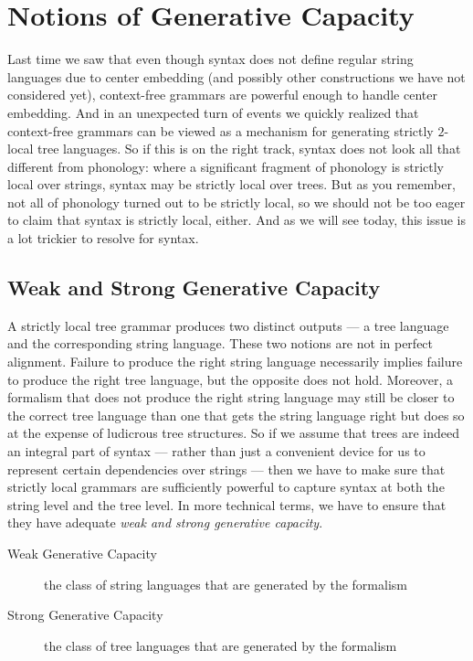 \chapter{Notions of Generative Capacity}
\label{cha:GenCap}

Last time we saw that even though syntax does not define regular string languages due to center embedding (and possibly other constructions we have not considered yet), context-free grammars are powerful enough to handle center embedding.
And in an unexpected turn of events we quickly realized that context-free grammars can be viewed as a mechanism for generating strictly $2$-local tree languages.
So if this is on the right track, syntax does not look all that different from phonology: where a significant fragment of phonology is strictly local over strings, syntax may be strictly local over trees.
But as you remember, not all of phonology turned out to be strictly local, so we should not be too eager to claim that syntax is strictly local, either.
And as we will see today, this issue is a lot trickier to resolve for syntax.


\section{Weak and Strong Generative Capacity}
A strictly local tree grammar produces two distinct outputs --- a tree language and the corresponding string language.
These two notions are not in perfect alignment.
Failure to produce the right string language necessarily implies failure to produce the right tree language, but the opposite does not hold.
Moreover, a formalism that does not produce the right string language may still be closer to the correct tree language than one that gets the string language right but does so at the expense of ludicrous tree structures.
So if we assume that trees are indeed an integral part of syntax --- rather than just a convenient device for us to represent certain dependencies over strings --- then we have to make sure that strictly local grammars are sufficiently powerful to capture syntax at both the string level and the tree level.
In more technical terms, we have to ensure that they have adequate \emph{weak and strong generative capacity}.
%
\begin{description}
    \item[Weak Generative Capacity] the class of string languages that are generated by the formalism
    \item[Strong Generative Capacity] the class of tree languages that are generated by the formalism
\end{description}

